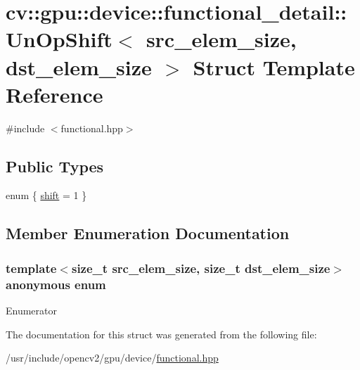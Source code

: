 \hypertarget{structcv_1_1gpu_1_1device_1_1functional__detail_1_1UnOpShift}{\section{cv\-:\-:gpu\-:\-:device\-:\-:functional\-\_\-detail\-:\-:Un\-Op\-Shift$<$ src\-\_\-elem\-\_\-size, dst\-\_\-elem\-\_\-size $>$ Struct Template Reference}
\label{structcv_1_1gpu_1_1device_1_1functional__detail_1_1UnOpShift}
}


{\ttfamily \#include $<$functional.\-hpp$>$}

\subsection*{Public Types}
\begin{DoxyCompactItemize}
\item 
enum \{ \hyperlink{structcv_1_1gpu_1_1device_1_1functional__detail_1_1UnOpShift_a6656a8a97e5c676fa801dece07298450abc848b4ceb16623a0619000352d378d6}{shift} = 1
 \}
\end{DoxyCompactItemize}


\subsection{Member Enumeration Documentation}
\hypertarget{structcv_1_1gpu_1_1device_1_1functional__detail_1_1UnOpShift_a6656a8a97e5c676fa801dece07298450}{\subsubsection[{anonymous enum}]{\setlength{\rightskip}{0pt plus 5cm}template$<$size\-\_\-t src\-\_\-elem\-\_\-size, size\-\_\-t dst\-\_\-elem\-\_\-size$>$ anonymous enum}}\label{structcv_1_1gpu_1_1device_1_1functional__detail_1_1UnOpShift_a6656a8a97e5c676fa801dece07298450}
\begin{Desc}
\item[Enumerator]\par
\begin{description}
\item[{\em 
\hypertarget{structcv_1_1gpu_1_1device_1_1functional__detail_1_1UnOpShift_a6656a8a97e5c676fa801dece07298450abc848b4ceb16623a0619000352d378d6}{shift}\label{structcv_1_1gpu_1_1device_1_1functional__detail_1_1UnOpShift_a6656a8a97e5c676fa801dece07298450abc848b4ceb16623a0619000352d378d6}
}]\end{description}
\end{Desc}


The documentation for this struct was generated from the following file\-:\begin{DoxyCompactItemize}
\item 
/usr/include/opencv2/gpu/device/\hyperlink{functional_8hpp}{functional.\-hpp}\end{DoxyCompactItemize}
